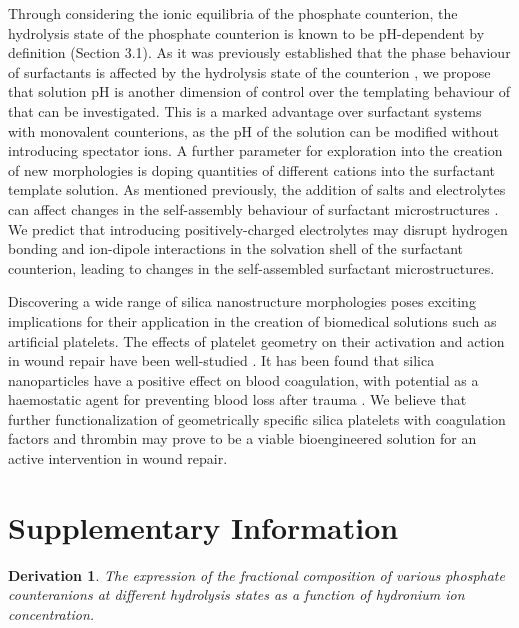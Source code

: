 \documentclass[a4paper,12pt,twocolumn]{article}
\newtheorem{thm}{Derivation} %
\begin{document}
	 Through considering the ionic equilibria of the phosphate counterion, the hydrolysis state of the phosphate counterion is known to be pH-dependent by definition (Section 3.1). As it was previously established that the phase behaviour of  surfactants is affected by the hydrolysis state of the counterion \cite{liu2014}, we propose that solution pH is another dimension of control over the templating behaviour of  that can be investigated. This is a marked advantage over surfactant systems with monovalent counterions, as the pH of the solution can be modified without introducing spectator ions. A further parameter for exploration into the creation of new morphologies is doping quantities of different cations into the surfactant template solution. As mentioned previously, the addition of salts and electrolytes can affect changes in the self-assembly behaviour of surfactant microstructures \cite{thalberg1991}. We predict that introducing positively-charged electrolytes may disrupt hydrogen bonding and ion-dipole interactions in the solvation shell of the surfactant counterion, leading to changes in the self-assembled surfactant microstructures.
	
	Discovering a wide range of silica nanostructure morphologies poses exciting implications for their application in the creation of biomedical solutions such as artificial platelets. The effects of platelet geometry on their activation and action in wound repair have been well-studied \cite{sakurai2015,kita2011}. It has been found that silica nanoparticles have a positive effect on blood coagulation, with potential as a haemostatic agent for preventing blood loss after trauma \cite{gryshchuk2016}. We believe that further functionalization of geometrically specific silica platelets with coagulation factors and thrombin may prove to be a viable bioengineered solution for an active intervention in wound repair.
	
	\raggedbottom 
	\pagebreak
	\onecolumn
	\printbibliography
	
	\pagebreak
	
	\renewcommand{\thefigure}{S\arabic{figure}}

	\setcounter{figure}{0}
	
	\section*{Supplementary Information}

    \begin{thm}The expression of the fractional composition of various phosphate counteranions at different hydrolysis states as a function of hydronium ion concentration.
    \end{thm}
\end{document}
